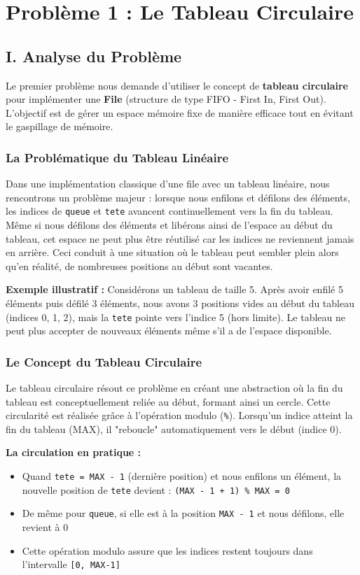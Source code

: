 \documentclass[a4paper, 11pt]{article}
\begin{document}
\section{Problème 1 : Le Tableau Circulaire}

\subsection{I. Analyse du Problème}

Le premier problème nous demande d'utiliser le concept de \textbf{tableau circulaire} pour implémenter une \textbf{File} (structure de type FIFO - First In, First Out). L'objectif est de gérer un espace mémoire fixe de manière efficace tout en évitant le gaspillage de mémoire.

\subsubsection*{La Problématique du Tableau Linéaire}
Dans une implémentation classique d'une file avec un tableau linéaire, nous rencontrons un problème majeur : lorsque nous enfilons et défilons des éléments, les indices de \texttt{queue} et \texttt{tete} avancent continuellement vers la fin du tableau. Même si nous défilons des éléments et libérons ainsi de l'espace au début du tableau, cet espace ne peut plus être réutilisé car les indices ne reviennent jamais en arrière. Ceci conduit à une situation où le tableau peut sembler plein alors qu'en réalité, de nombreuses positions au début sont vacantes.

\textbf{Exemple illustratif :} Considérons un tableau de taille 5. Après avoir enfilé 5 éléments puis défilé 3 éléments, nous avons 3 positions vides au début du tableau (indices 0, 1, 2), mais la \texttt{tete} pointe vers l'indice 5 (hors limite). Le tableau ne peut plus accepter de nouveaux éléments même s'il a de l'espace disponible.

\subsubsection*{Le Concept du Tableau Circulaire}
Le tableau circulaire résout ce problème en créant une abstraction où la fin du tableau est conceptuellement reliée au début, formant ainsi un cercle. Cette circularité est réalisée grâce à l'opération modulo (\texttt{\%}). Lorsqu'un indice atteint la fin du tableau (MAX), il "reboucle" automatiquement vers le début (indice 0).

\textbf{La circulation en pratique :}
\begin{itemize}
    \item Quand \texttt{tete = MAX - 1} (dernière position) et nous enfilons un élément, la nouvelle position de \texttt{tete} devient : \texttt{(MAX - 1 + 1) \% MAX = 0}
    \item De même pour \texttt{queue}, si elle est à la position \texttt{MAX - 1} et nous défilons, elle revient à 0
    \item Cette opération modulo assure que les indices restent toujours dans l'intervalle \texttt{[0, MAX-1]}
\end{itemize}
\end{document}

